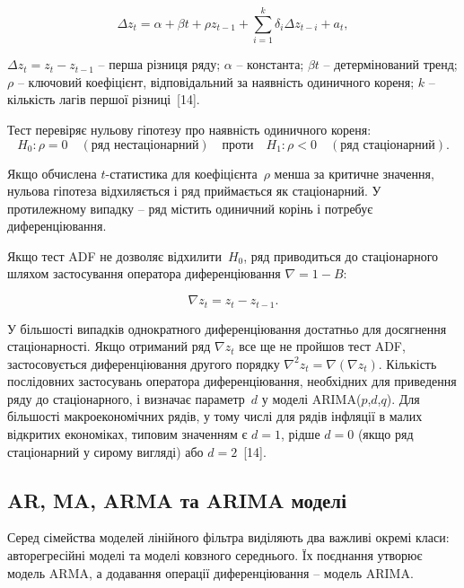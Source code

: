 \documentclass{bachelor_thesis}
\begin{document}
\begin{equation*}
\Delta z_t = \alpha + \beta t + \rho z_{t-1} + \sum_{i=1}^{k} \delta_i \Delta z_{t-i} + a_t,
\end{equation*}

 $\Delta z_t = z_t - z_{t-1}$ -- перша різниця ряду; $\alpha$ -- константа; $\beta t$ -- детермінований тренд; $\rho$ -- ключовий коефіцієнт, відповідальний за наявність одиничного кореня; $k$ -- кількість лагів першої різниці~[14].

Тест перевіряє нульову гіпотезу про наявність одиничного кореня:
\begin{equation*}
H_0: \rho = 0 \quad (\text{ряд нестаціонарний}) \quad \text{проти} \quad H_1: \rho < 0 \quad (\text{ряд стаціонарний}).
\end{equation*}

Якщо обчислена $t$-статистика для коефіцієнта~$\rho$ менша за критичне значення, нульова гіпотеза відхиляється і ряд приймається як стаціонарний. У протилежному випадку -- ряд містить одиничний корінь і потребує диференціювання.

Якщо тест ADF не дозволяє відхилити~$H_0$, ряд приводиться до стаціонарного шляхом застосування оператора диференціювання $\nabla = 1 - B$:

\begin{equation*}
\nabla z_t = z_t - z_{t-1}.
\end{equation*}

У більшості випадків однократного диференціювання достатньо для досягнення стаціонарності. Якщо отриманий ряд $\nabla z_t$ все ще не пройшов тест ADF, застосовується диференціювання другого порядку $\nabla^2 z_t = \nabla(\nabla z_t)$. Кількість послідовних застосувань оператора диференціювання, необхідних для приведення ряду до стаціонарного, і визначає параметр~$d$ у моделі ARIMA($p$,$d$,$q$). Для більшості макроекономічних рядів, у тому числі для рядів інфляції в малих відкритих економіках, типовим значенням є $d = 1$, рідше $d = 0$ (якщо ряд стаціонарний у сирому вигляді) або $d = 2$~[14].


\subsection{AR, MA, ARMA та ARIMA моделі}

Серед сімейства моделей лінійного фільтра виділяють два важливі окремі класи: авторегресійні моделі та моделі ковзного середнього. Їх поєднання утворює модель ARMA, а додавання операції диференціювання -- модель ARIMA.
\end{document}
